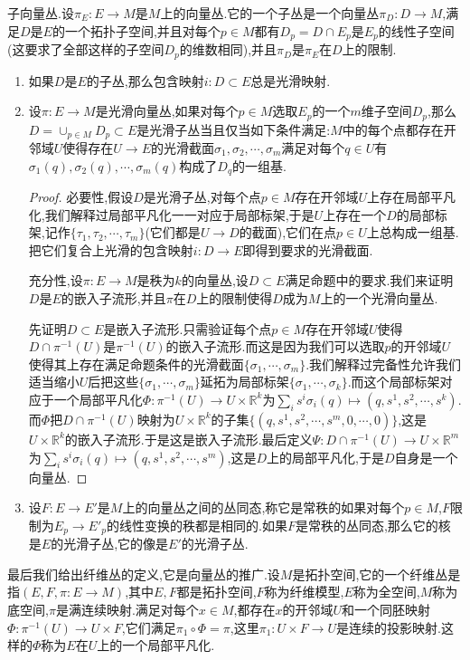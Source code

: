 子向量丛.设$\pi_E:E\to M$是$M$上的向量丛.它的一个子丛是一个向量丛$\pi_D:D\to M$,满足$D$是$E$的一个拓扑子空间,并且对每个$p\in M$都有$D_p=D\cap E_p$是$E_p$的线性子空间(这要求了全部这样的子空间$D_p$的维数相同),并且$\pi_D$是$\pi_E$在$D$上的限制.
\begin{enumerate}
	\item 如果$D$是$E$的子丛,那么包含映射$i:D\subset E$总是光滑映射.
	\item 设$\pi:E\to M$是光滑向量丛,如果对每个$p\in M$选取$E_p$的一个$m$维子空间$D_p$,那么$D=\cup_{p\in M}D_p\subset E$是光滑子丛当且仅当如下条件满足:$M$中的每个点都存在开邻域$U$使得存在$U\to E$的光滑截面$\sigma_1,\sigma_2,\cdots,\sigma_m$满足对每个$q\in U$有$\sigma_1(q),\sigma_2(q),\cdots,\sigma_m(q)$构成了$D_q$的一组基.
	\begin{proof}
		
		必要性,假设$D$是光滑子丛,对每个点$p\in M$存在开邻域$U$上存在局部平凡化,我们解释过局部平凡化一一对应于局部标架,于是$U$上存在一个$D$的局部标架,记作$\{\tau_1,\tau_2,\cdots,\tau_m\}$(它们都是$U\to D$的截面),它们在点$p\in U$上总构成一组基.把它们复合上光滑的包含映射$i:D\to E$即得到要求的光滑截面.
		
		充分性,设$\pi:E\to M$是秩为$k$的向量丛,设$D\subset E$满足命题中的要求.我们来证明$D$是$E$的嵌入子流形,并且$\pi$在$D$上的限制使得$D$成为$M$上的一个光滑向量丛.
		
		先证明$D\subset E$是嵌入子流形.只需验证每个点$p\in M$存在开邻域$U$使得$D\cap\pi^{-1}(U)$是$\pi^{-1}(U)$的嵌入子流形.而这是因为我们可以选取$p$的开邻域$U$使得其上存在满足命题条件的光滑截面$\{\sigma_1,\cdots,\sigma_m\}$.我们解释过完备性允许我们适当缩小$U$后把这些$\{\sigma_1,\cdots,\sigma_m\}$延拓为局部标架$\{\sigma_1,\cdots,\sigma_k\}$.而这个局部标架对应于一个局部平凡化$\Phi:\pi^{-1}(U)\to U\times\mathbb{R}^k$为$\sum_is^i\sigma_i(q)\mapsto(q,s^1,s^2,\cdots,s^k)$.而$\Phi$把$D\cap\pi^{-1}(U)$映射为$U\times\mathbb{R}^k$的子集$\{(q,s^1,s^2,\cdots,s^m,0,\cdots,0)\}$,这是$U\times\mathbb{R}^k$的嵌入子流形.于是这是嵌入子流形.最后定义$\Psi:D\cap\pi^{-1}(U)\to U\times\mathbb{R}^m$为$\sum_is^i\sigma_i(q)\mapsto(q,s^1,s^2,\cdots,s^m)$,这是$D$上的局部平凡化,于是$D$自身是一个向量丛.
	\end{proof}
    \item 设$F:E\to E'$是$M$上的向量丛之间的丛同态,称它是常秩的如果对每个$p\in M$,$F$限制为$E_p\to E'_p$的线性变换的秩都是相同的.如果$F$是常秩的丛同态,那么它的核是$E$的光滑子丛,它的像是$E'$的光滑子丛.
\end{enumerate}

最后我们给出纤维丛的定义,它是向量丛的推广.设$M$是拓扑空间,它的一个纤维丛是指$(E,F,\pi:E\to M)$,其中$E,F$都是拓扑空间,$F$称为纤维模型,$E$称为全空间,$M$称为底空间,$\pi$是满连续映射.满足对每个$x\in M$,都存在$x$的开邻域$U$和一个同胚映射$\Phi:\pi^{-1}(U)\to U\times F$,它们满足$\pi_1\circ\Phi=\pi$,这里$\pi_1:U\times F\to U$是连续的投影映射.这样的$\Phi$称为$E$在$U$上的一个局部平凡化.

